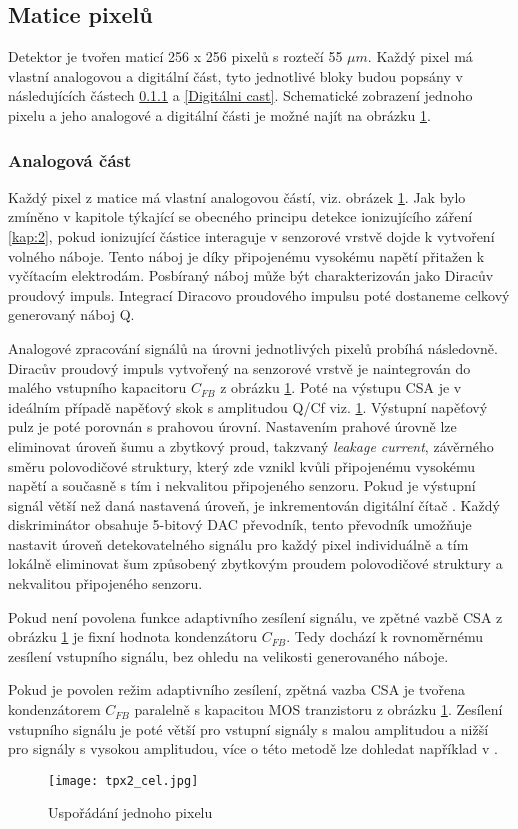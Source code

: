 \subsection{Matice pixelů}
Detektor je tvořen maticí 256 x 256 pixelů s roztečí  55 $\mu$$m$. Každý pixel má vlastní analogovou a digitální část, tyto jednotlivé bloky budou popsány v následujících částech \ref{analog} a \ref{Digitálni cast}. Schematické zobrazení jednoho pixelu a jeho analogové a digitální části je možné najít na obrázku \ref{fig:tpx2_cell}.
\subsubsection{Analogová část}	 
\label{analog}
Každý pixel z matice má vlastní analogovou částí, viz. obrázek \ref{fig:tpx2_cell}. Jak bylo zmíněno v kapitole týkající se obecného principu detekce ionizujícího záření \ref{kap:2}, pokud ionizující částice interaguje v senzorové vrstvě dojde k vytvoření volného náboje. Tento náboj je díky připojenému vysokému napětí přitažen k vyčítacím elektrodám. Posbíraný náboj může být charakterizován jako Diracův proudový impuls. Integrací Diracovo proudového impulsu poté dostaneme celkový generovaný náboj Q. 
\par Analogové zpracování signálů na úrovni jednotlivých pixelů probíhá následovně. Diracův proudový impuls vytvořený na senzorové vrstvě je naintegrován do malého vstupního kapacitoru $C_{FB}$ z obrázku \ref{fig:tpx2_cell}. Poté na výstupu CSA je v ideálním případě napěťový skok s amplitudou Q/Cf viz. \ref{fig:tpx2_cell}. Výstupní napěťový pulz je poté porovnán s prahovou úrovní. Nastavením prahové úrovně lze eliminovat úroveň šumu a zbytkový proud, takzvaný \textit{leakage current}, závěrného směru polovodičové struktury, který zde vznikl kvůli připojenému vysokému napětí a současně s tím i nekvalitou připojeného senzoru. Pokud je výstupní signál větší než daná nastavená úroveň, je inkrementován digitální čítač \cite{Llopart}. Každý diskriminátor obsahuje 5-bitový DAC převodník, tento převodník umožňuje nastavit úroveň detekovatelného signálu pro každý pixel individuálně a tím lokálně eliminovat šum způsobený zbytkovým proudem polovodičové struktury a nekvalitou připojeného senzoru.
\par Pokud není povolena funkce adaptivního zesílení signálu, ve zpětné vazbě CSA z obrázku \ref{fig:tpx2_cell} je fixní hodnota kondenzátoru $C_{FB}$. Tedy dochází k rovnoměrnému zesílení vstupního signálu, bez ohledu na velikosti generovaného náboje. 
\par Pokud je povolen režim adaptivního zesílení, zpětná vazba CSA je tvořena kondenzátorem $C_{FB}$ paralelně s kapacitou MOS tranzistoru z obrázku \ref{fig:tpx2_cell}. Zesílení vstupního signálu je poté větší pro vstupní signály s malou amplitudou a nižší pro signály s vysokou amplitudou, více o této metodě lze dohledat například v \cite{MOS}.
\begin{figure}[h!]
	\centering
	\captionsetup{justification=centering}
	\texttt{[image: tpx2\_cel.jpg]}
	\caption{Uspořádání jednoho pixelu \cite{Timepix2}}
	\label{fig:tpx2_cell}
\end{figure}

